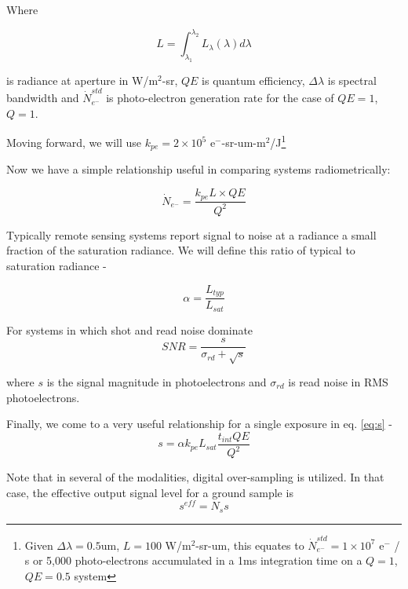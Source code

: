\documentclass[10pt,journal]{IEEEtran}  %
\begin{document}
Where 

\begin{equation*}
    L = \int_{\lambda_1}^{\lambda_2}L_{\lambda}(\lambda)d\lambda
\end{equation*}

is radiance at aperture in W/m$^2$-sr, $QE$ is quantum efficiency, $\Delta \lambda$ is spectral bandwidth and $\dot{N}_{e^-}^{std}$ is photo-electron generation rate for the case of $QE=1$, $Q=1$.

Moving forward, we will use $k_{pe} = 2\times 10^5$ e$^-$-sr-um-m$^2$/J\footnote{Given $\Delta \lambda = 0.5$um, $L = 100$ W/m$^2$-sr-um, this equates to $\dot{N}_{e^-}^{std} = 1\times 10^7$ e$^-$ / s or 5,000 photo-electrons accumulated in a 1ms integration time on a $Q=1$, $QE=0.5$ system}

Now we have a simple relationship useful in comparing systems radiometrically:

\begin{equation}
\dot{N}_{e^-} = \frac{k_{pe} L \times QE}{Q^2}
\label{eq:N_e_dot}
\end{equation}

Typically remote sensing systems report signal to noise at a radiance a small fraction of the saturation radiance.  We will define this ratio of typical to saturation radiance - 

\begin{equation}
\alpha = \frac{L_{typ}}{L_{sat}}
\label{eq:alpha}
\end{equation}

For systems in which shot and read noise dominate
\begin{equation}
SNR = \frac{s}{\sigma_{rd} + \sqrt{s}}
\label{eq:snr}
\end{equation}

where $s$ is the signal magnitude in photoelectrons and $\sigma_{rd}$ is read noise in RMS photoelectrons.

Finally, we come to a very useful relationship for a single exposure in eq. \eqref{eq:s} -
\begin{equation}
s = \alpha k_{pe}L_{sat} \frac{t_{int}QE}{Q^2}
\label{eq:s}
\end{equation}

Note that in several of the modalities, digital over-sampling is utilized.  In that case, the effective output signal level for a ground sample is 
\begin{equation*}
    s^{eff} = N_s s
\end{equation*}
\end{document}
